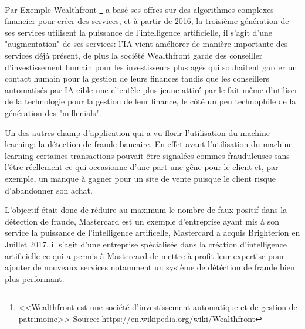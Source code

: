         Par Exemple Wealthfront \footnote{<<Wealthfront est une société d'investissement automatique 
        et de gestion de patrimoine>> \newline Source: \url{https://en.wikipedia.org/wiki/Wealthfront} }
        a basé ses offres sur des algorithmes complexes financier pour créer des services,
        et à partir de 2016, la troisième génération de ses services utilisent la puissance 
        de l'intelligence artificielle, il s'agit d'une "augmentation" de ses services: 
        l'IA vient améliorer de manière importante des services déjà présent, de plus 
        la société Wealthfront garde des conseiller d'investissement humain 
        pour les investisseurs plus agés qui souhaitent garder un contact humain pour
        la gestion de leurs finances tandis que les conseillers automatisés par IA 
        cible une clientèle plus jeune attiré par le fait même d'utiliser de la technologie 
        pour la gestion de leur finance, le côté un peu technophile de la génération des "millenials". \newline

        Un des autres champ d'application qui a vu florir l'utilisation du machine learning: 
        la détection de fraude bancaire. En effet avant l'utilisation du machine learning 
        certaines transactions pouvait être signalées commes frauduleuses sans l'être réellement 
        ce qui occasionne d'une part une gêne pour le client et, par exemple, un manque à gagner pour 
        un site de vente puisque le client risque d'abandonner son achat. \newline

        L'objectif était donc de réduire au maximum le nombre de faux-positif dans 
        la détection de fraude, Mastercard est un exemple d'entreprise ayant mis 
        à son service la puissance de l'intelligence artificelle, Mastercard a
        acquis Brighterion en Juillet 2017, il s'agit d'une entreprise spécialisée 
        dans la création d'intelligence artificielle ce qui a permis à Mastercard de 
        mettre à profit leur expertise pour ajouter de nouveaux services 
        notamment un système de détéction de fraude bien plus performant. \newline

